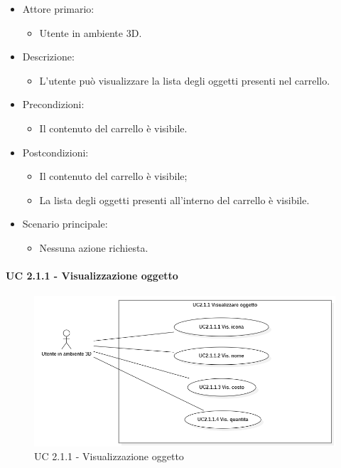 \begin{itemize}
	
	\item Attore primario: 
	\begin{itemize}
		\item Utente in ambiente 3D.
	\end{itemize}
	\item Descrizione:
	\begin{itemize}
		\item L'utente può visualizzare la lista degli oggetti presenti nel carrello.
	\end{itemize}
	
	\item Precondizioni:
	\begin{itemize}
		\item Il contenuto del carrello è visibile.
	\end{itemize}
	
	\item Postcondizioni:
	\begin{itemize}
		\item Il contenuto del carrello è visibile;
		\item La lista degli oggetti presenti all'interno del carrello è visibile.
	\end{itemize}
	
	\item Scenario principale:
	\begin{itemize}
		\item Nessuna azione richiesta.
	\end{itemize}
	
\end{itemize}

\paragraph{UC 2.1.1 - Visualizzazione oggetto}

\begin{figure}[H]
  \renewcommand{\thefigure}{4}
  \includegraphics[width=\linewidth]{./res/images/UC2.1.1.png}
  \caption{UC 2.1.1 - Visualizzazione oggetto}
  \label{fig:UC 2.1.1}
\end{figure}

